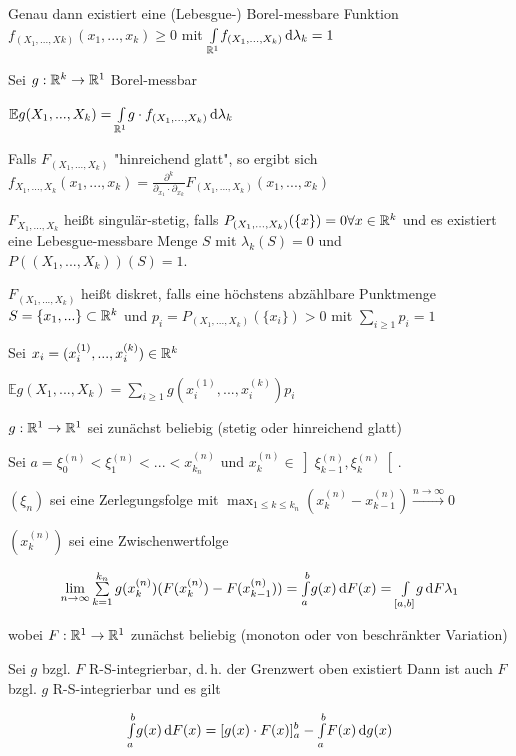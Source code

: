 \documentclass{cheat-sheet}
\newcommand{\E}{\mathbb{E}} %
\begin{document}
Genau dann existiert eine (Lebesgue-) Borel-messbare Funktion $f_{(X_1, ..., Xk)}(x_1, ..., x_k) \geq 0$ mit ${\textstyle \int\limits_{\mathbb{R}^1}^{}} f_{(X_1, ..., X_k)} \,\mathrm{d} \lambda_k = 1$

Sei $g : \mathbb{R}^k \to \mathbb{R}^1$ Borel-messbar

$\E g(X_1, ..., X_k) = \Int{\R^1}{}{g \cdot f_{(X_1, ..., X_k)}}{\lambda_k}$
 
Falls $F_{(X_1, ..., X_k)}$ "hinreichend glatt", so ergibt sich
$f_{X_1, ..., X_k}(x_1, ..., x_k) = \frac{\partial^k}{\partial_{x_1} \cdot \partial_{x_k}} F_{(X_1, ..., X_k)}(x_1, ..., x_k)$

$F_{X_1, ..., X_k}$ heißt singulär-stetig, falls $P_{(X_1, ..., X_k)}(\{ x \}) = 0 \forall x \in \mathbb{R}^k$
und es existiert eine Lebesgue-messbare Menge $S$ mit $\lambda_k(S) = 0$ und $P((X_1, ..., X_k))(S) = 1$.

$F_{(X_1, ..., X_k)}$ heißt diskret, falls eine höchstens abzählbare Punktmenge $S = \{ x_1, ... \} \subset \mathbb{R}^k$ und $p_i = P_{(X_1, ..., X_k)}(\{ x_i \}) > 0$ mit $\sum_{i \geq 1} p_i = 1$

Sei $x_i = (x_i^{(1)}, ..., x_i^{(k)}) \in \mathbb{R}^k$

$\E g(X_1, ..., X_k) = \sum_{i \geq 1} g(x_i^{(1)}, ..., x_i^{(k)}) p_i$


$g : \mathbb{R}^1 \to \mathbb{R}^1$ sei zunächst beliebig (stetig oder hinreichend glatt)

Sei $a = \xi_0^{(n)} < \xi_1^{(n)} < ... < x_{k_n}^{(n)}$ und $x_k^{(n)} \in \left] \xi_{k-1}^{(n)}, \xi_{k}^{(n)} \right[$.

\begin{defn}
  $(\xi_n)$ sei eine Zerlegungsfolge mit $\max_{1 \leq k \leq k_n} (x_k^{(n)} - x_{k-1}^{(n)}) \xrightarrow{n \to \infty} 0$

  $(x_k^{(n)})$ sei eine Zwischenwertfolge

  \[ \lim_{n \to \infty} \sum_{k=1}^{k_n} g(x_k^{(n)}) (F(x_k^{(n)}) - F(x_{k-1}^{(n)})) = \Int{a}{b}{g(x)}{F(x)} = \Int{[a, b]}{}{g}{F\lambda_1} \]

  wobei $F : \mathbb{R}^1 \to \mathbb{R}^1$ zunächst beliebig (monoton oder von beschränkter Variation)
\end{defn}


Sei $g$ bzgl. $F$ R-S-integrierbar, d.\,h. der Grenzwert oben existiert
Dann ist auch $F$ bzgl. $g$ R-S-integrierbar und es gilt

\[ {\textstyle \int\limits_{a}^{b}} g(x) \,\mathrm{d} F(x) = [g(x) \cdot F(x)]_a^b - {\textstyle \int\limits_{a}^{b}} F(x) \,\mathrm{d} g(x) \]
\end{document}
